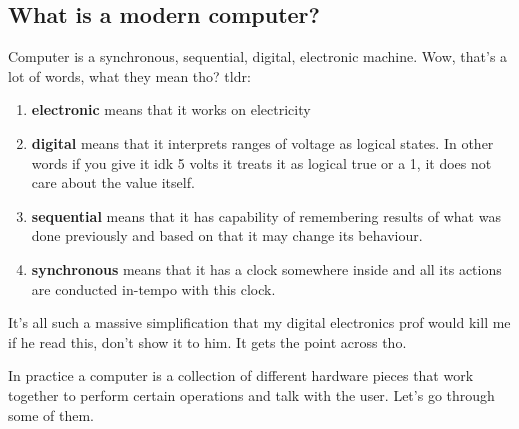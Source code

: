 \documentclass[../ops.tex]{subfiles}
\begin{document}
        \subsection{What is a modern computer?}
        Computer is a synchronous, sequential, digital, electronic machine. Wow,
        that's a lot of words, what they mean tho? tldr:
        \begin{enumerate}
                \item {\bf electronic} means that it works on electricity
                \item {\bf digital} means that it interprets ranges of voltage
                        as logical states. In other words if you give it idk
                        5 volts it treats it as logical true or a 1, it does not
                        care about the value itself.
                \item {\bf sequential} means that it has capability of
                        remembering results of what was done previously and
                        based on that it may change its behaviour.
                \item {\bf synchronous} means that it has a clock somewhere
                        inside and all its actions are conducted in-tempo with
                        this clock.
        \end{enumerate}
        It's all such a massive simplification that my digital electronics prof
        would kill me if he read this, don't show it to him. It gets the point
        across tho.

        In practice a computer is a collection of different hardware pieces that
        work together to perform certain operations and talk with the user.
        Let's go through some of them.
\end{document}

